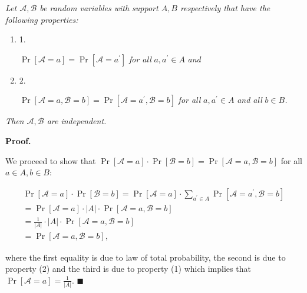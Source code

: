 \documentclass[10pt,a4paper]{article}
\begin{document}
\emph{Let $\mathcal{A},\mathcal{B}$ be random variables with support $A,B$ respectively that have the following properties:}\par


\begin{enumerate}


\item[] 1. 


$\Pr[\mathcal{A}=a]=\Pr[\mathcal{A}=a^{\prime}]$\emph{ for all }$a,a^{\prime}\in A$\emph{ and}\par




\item[] 2. 


$\Pr[\mathcal{A}=a,\mathcal{B}=b]=\Pr[\mathcal{A}=a^{\prime},\mathcal{B}=b]$\emph{ for all }$a,a^{\prime}\in A$\emph{ and all }$b\in B$\emph{.}\par




\end{enumerate}


\emph{Then $\mathcal{A},\mathcal{B}$ are independent.}\par






\par\medskip\noindent\textbf{Proof.}\par



We proceed to show that $\Pr[\mathcal{A}=a]\cdot\Pr[\mathcal{B}=b]=\Pr[\mathcal{A}=a,\mathcal{B}=b]$ for all $a\in A,b\in B$:\par


\[\begin{gathered}
\displaystyle\Pr[\mathcal{A}=a]\cdot\Pr[\mathcal{B}=b] \displaystyle=\Pr[\mathcal{A}=a]\cdot\sum_{a^{\prime}\in A}\Pr[\mathcal{A}=a^{\prime},\mathcal{B}=b] \\
\displaystyle=\Pr[\mathcal{A}=a]\cdot|A|\cdot\Pr[\mathcal{A}=a,\mathcal{B}=b] \\
\displaystyle=\frac{1}{|A|}\cdot|A|\cdot\Pr[\mathcal{A}=a,\mathcal{B}=b] \\
\displaystyle=\Pr[\mathcal{A}=a,\mathcal{B}=b],
\end{gathered}\]


where the first equality is due to law of total probability, the second is due to property (2) and the third is due to property (1) which implies that $\Pr[\mathcal{A}=a]=\frac{1}{|A|}$.
\ensuremath{\blacksquare}\par
\end{document}

